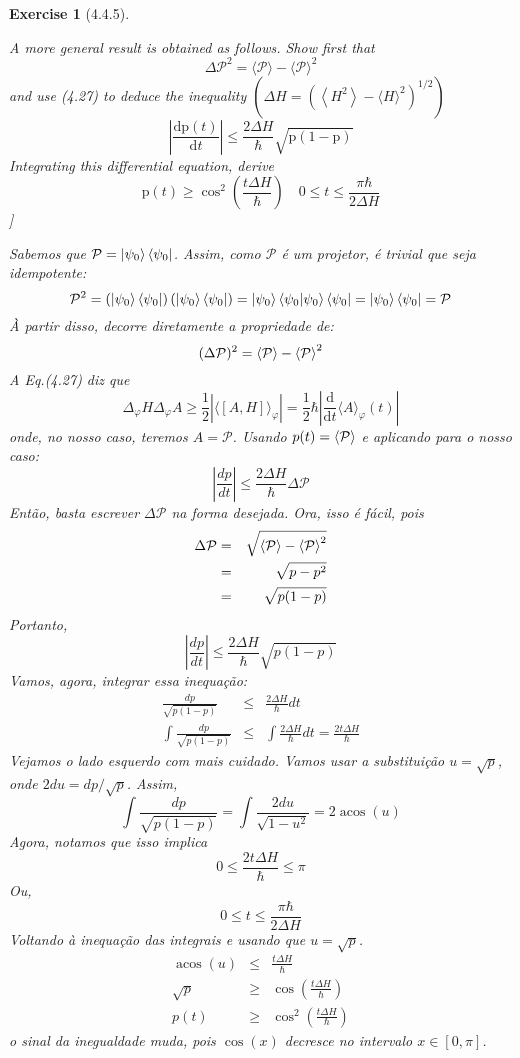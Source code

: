 \documentclass[12pt]{article}
\def\be{\begin{equation}}
\def\ee{\end{equation}}
\def\bea{\begin{eqnarray*}}
\def\eea{\end{eqnarray*}}
\def\f{\frac}
\def\l{\left}
\def\r{\right}
\newtheorem{exercise}{Exercise}
\DeclareMathOperator{\acos}{acos}
\begin{document}
\begin{exercise}[4.4.5]
\begin{exercises}
			\item A more general result is obtained as follows. Show first that
			$$
			\Delta \mathcal{P}^{2}=\langle\mathcal{P}\rangle-\langle\mathcal{P}\rangle^{2}
			$$
			and use (4.27) to deduce the inequality $\left(\Delta H=\left(\left\langle H^{2}\right\rangle-\langle H\rangle^{2}\right)^{1 / 2}\right)$
			$$
			\left|\frac{\mathrm{d} \mathrm{p}(t)}{\mathrm{d} t}\right| \leq \frac{2 \Delta H}{\hbar} \sqrt{\mathrm{p}(1-\mathrm{p})}
			$$
			Integrating this differential equation, derive
			$$
			\mathrm{p}(t) \geq \cos ^{2}\left(\frac{t \Delta H}{\hbar}\right) \quad 0 \leq t \leq \frac{\pi \hbar}{2 \Delta H}
			$$		]
			\begin{multianswer}
				Sabemos que $\mathcal{P} = \ket{\psi_0}\bra{\psi_0}$. Assim, como $\mathcal{P}$ é um projetor, é trivial que seja idempotente:
				\be
					\mathcal{P}^2 = \l(\ket{\psi_0}\bra{\psi_0}\r)\l(\ket{\psi_0}\bra{\psi_0}\r) = \ket{\psi_0}\braket{\psi_0|\psi_0}\bra{\psi_0} = \ket{\psi_0}\bra{\psi_0} = \mathcal{P}
				\ee
				À partir disso, decorre diretamente a propriedade de:
				\be
					(\Delta\mathcal{P})^2 = \braket{\mathcal{P}} - \braket{\mathcal{P}}^2
				\ee
				A Eq.(4.27) diz que
				\be
					\Delta_{\varphi} H \Delta_{\varphi} A \geq \frac{1}{2}\left|\langle[A, H]\rangle_{\varphi}\right|=\frac{1}{2} \hbar\left|\frac{\mathrm{d}}{\mathrm{d} t}\langle A\rangle_{\varphi}(t)\right|
				\ee
				onde, no nosso caso, teremos $A=\mathcal{P}$. Usando $p(t)=\braket{\mathcal{P}}$ e aplicando para o nosso caso:
				\be
					\l|\f{dp}{dt}\r| \leq \f{2\Delta H}{\hbar}\Delta\mathcal{P} 
				\ee
				Então, basta escrever $\Delta\mathcal{P}$ na forma desejada. Ora, isso é fácil, pois
				\bea
					\Delta\mathcal{P} &=& \sqrt{\braket{\mathcal{P}} - \braket{\mathcal{P}}^2} \\
							&=& \sqrt{p - p^2} \\
							&=& \sqrt{p(1-p)}
				\eea
				Portanto, 
				\be
					\l|\f{dp}{dt}\r| \leq \f{2\Delta H}{\hbar}\sqrt{p(1-p)} 
				\ee
				Vamos, agora, integrar essa inequação:
				\bea
					\f{dp}{\sqrt{p(1-p)}} &\leq& \f{2\Delta H}{\hbar} dt  \\
					\int \f{dp}{\sqrt{p(1-p)}} &\leq& \int \f{2\Delta H}{\hbar} dt = \f{2t\Delta H}{\hbar}
				\eea
				Vejamos o lado esquerdo com mais cuidado. Vamos usar a substituição $u=\sqrt{p}$, onde $2du = dp/\sqrt{p}$. Assim, 
				\be
					\int \f{dp}{\sqrt{p(1-p)}} = \int \f{2du}{\sqrt{1-u^2}} = 2\acos(u)
				\ee
				Agora, notamos que isso implica
				\be
					0 \leq \f{2t\Delta H}{\hbar} \leq \pi
				\ee
				Ou,
				\be
					0 \leq t \leq \frac{\pi \hbar}{2 \Delta H}
				\ee
				Voltando à inequação das integrais e usando que $u=\sqrt{p}$. 
				\bea
					\acos(u) &\leq& \f{t\Delta H}{\hbar} \\ 
					\sqrt{p} &\geq& \cos\l(\f{t\Delta H}{\hbar}\r)  \\
					p(t) &\geq& \cos^2\l(\f{t\Delta H}{\hbar}\r) 
				\eea
				o sinal da inegualdade muda, pois $\cos(x)$ decresce no intervalo $x\in[0, \pi]$. 	
			\end{multianswer}
		

\end{exercises}
\end{exercise}
\end{document}
